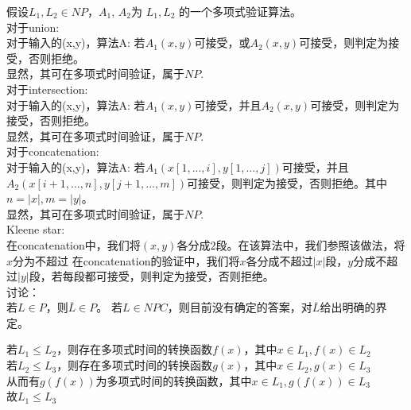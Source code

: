 \documentclass[a4paper, justified]{tufte-handout}
\begin{document}
\begin{problem}[TC 34.2-4]
\end{problem}

\begin{solution}
假设$L_1, L_2\in NP$，$A_1$, $A_2$为 $L_1, L_2$ 的一个多项式验证算法。\\
对于union: \\
对于输入的(x,y)，算法A: 若$A_1(x,y)$可接受，或$A_2(x,y)$可接受，则判定为接受，否则拒绝。\\
显然，其可在多项式时间验证，属于$NP$.\\
对于intersection: \\
对于输入的(x,y)，算法A: 若$A_1(x,y)$可接受，并且$A_2(x,y)$可接受，则判定为接受，否则拒绝。\\
显然，其可在多项式时间验证，属于$NP$.\\
对于concatenation: \\
对于输入的(x,y)，算法A: 若$A_1(x[1,...,i],y[1,...,j])$可接受，并且$A_2(x[i+1,...,n],y[j+1,...,m])$可接受，则判定为接受，否则拒绝。其中$n=|x|, m = |y|$。\\
显然，其可在多项式时间验证，属于$NP$.\\
 Kleene star:\\
 在concatenation中，我们将$(x,y)$各分成$2$段。在该算法中，我们参照该做法，将$x$分为不超过
 在concatenation的验证中，我们将$x$各分成不超过$|x|$段，$y$分成不超过$|y|$段，若每段都可接受，则判定为接受，否则拒绝。\\
 讨论：\\
 若$L\in P$，则$\overline{L}\in P$。 若$L\in NPC$，则目前没有确定的答案，对$\overline{L}$给出明确的界定。
\end{solution}

\begin{problem}[TC 34.3-2]
\end{problem}

\begin{solution}
若$L_1\leq L_2$，则存在多项式时间的转换函数$f(x)$，其中$x\in L_1, f(x) \in L_2$\\
若$L_2\leq L_3$，则存在多项式时间的转换函数$g(x)$，其中$x\in L_2, g(x) \in L_3$\\
从而有$g(f(x))$为多项式时间的转换函数，其中$x\in L_1, g(f(x)) \in L_3$\\
故$L_1\leq L_3$
\end{solution}

\begin{problem}[TC 34.4-3]
\end{problem}
\end{document}
